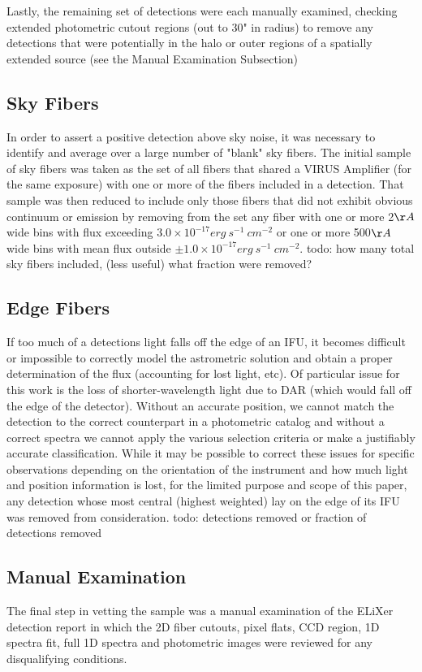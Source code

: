 \documentclass{aastex62}
\begin{document}
Lastly, the remaining set of detections were each manually examined, checking extended photometric cutout regions (out to 30" in radius) to remove any detections that were potentially in the halo or outer regions of a spatially extended source (see the Manual Examination Subsection)


\subsection{Sky Fibers}
In order to assert a positive detection above sky noise, it was necessary to identify and average over a large number of "blank" sky fibers. The initial sample of sky fibers was taken as the set of all fibers that shared a VIRUS Amplifier (for the same exposure) with one or more of the fibers included in a detection. That sample was then reduced to include only those fibers that did not exhibit obvious continuum or emission by removing from the set any fiber with one or more 2$\AA$ wide bins with flux exceeding $3.0\times 10^{-17} erg\ s^{-1}\ cm^{-2}$ or one or more 500$\AA$ wide bins with mean flux outside $\pm 1.0 \times 10^{-17} erg\ s^{-1}\ cm^{-2}$.    { \color{red} todo: how many total sky fibers included, (less useful) what fraction were removed?}
 
\subsection{Edge Fibers}
If too much of a detections light falls off the edge of an IFU, it becomes difficult or impossible to correctly model the astrometric solution and obtain a proper determination of the flux (accounting for lost light, etc). Of particular issue for this work is the loss of shorter-wavelength light due to DAR (which would fall off the edge of the detector). Without an accurate position, we cannot match the detection to the correct counterpart in a photometric catalog and without a correct spectra we cannot apply the various selection criteria or make a justifiably accurate classification. While it may be possible to correct these issues for specific observations depending on the orientation of the instrument and how much light and position information is lost, for the limited purpose and scope of this paper, any detection whose most central (highest weighted) lay on the edge of its IFU was removed from consideration.  { \color{red} todo: detections removed or fraction of detections removed}

\subsection{Manual Examination}
The final step in vetting the sample was a manual examination of the ELiXer detection report in which the 2D fiber cutouts, pixel flats, CCD region, 1D spectra fit, full 1D spectra and photometric images were reviewed for any disqualifying conditions.
\end{document}
